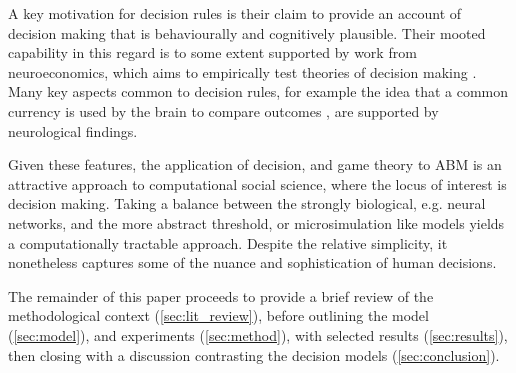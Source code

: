 A key motivation for decision rules is their claim to provide an account of decision making that is behaviourally and cognitively plausible. Their mooted capability in this regard is to some extent supported by work from neuroeconomics, which aims to empirically test theories of decision making \citep{Rustichini2009}. Many key aspects common to decision rules, for example the idea that a common currency is used by the brain to compare outcomes \citep{Padoa-Schioppa2006,Padoa-Schioppa2008}, are supported by neurological findings. 

Given these features, the application of decision, and game theory to \ac{ABM} is an attractive approach to computational social science, where the locus of interest is decision making. Taking a balance between the strongly biological, e.g. neural networks, and the more abstract threshold, or microsimulation like models yields a computationally tractable approach. Despite the relative simplicity, it nonetheless captures some of the nuance and sophistication of human decisions.


The remainder of this paper proceeds to provide a brief review of the methodological context (\ref{sec:lit_review}), before outlining the model (\ref{sec:model}), and experiments (\ref{sec:method}), with selected results (\ref{sec:results}), then closing with a discussion contrasting the decision models (\ref{sec:conclusion}).